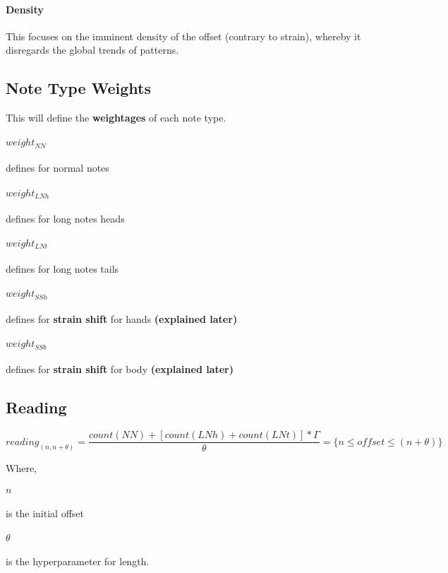 \documentclass{article}
\begin{document}
\paragraph{Density} This focuses on the imminent density of the offset (contrary to strain), whereby it disregards the global trends of patterns.

\subsection{Note Type Weights}

This will define the \textbf{weightages} of each note type.
\paragraph{$weight_{NN}$} defines for normal notes
\paragraph{$weight_{LNh}$} defines for long notes heads
\paragraph{$weight_{LNt}$} defines for long notes tails
\paragraph{$weight_{SSh}$} defines for \textbf{strain shift} for hands \textbf{(explained later)}
\paragraph{$weight_{SSb}$} defines for \textbf{strain shift} for body \textbf{(explained later)}

\subsection{Reading}

$$ reading_{(n,n+\theta)} = 
\frac{ count(NN) + \left[ count(LNh) + count(LNt)\right] * \Gamma }{\theta}
= \lbrace n \leq offset \leq (n+ \theta) \rbrace$$

Where,

\paragraph{$n$} is the initial offset
\paragraph{$\theta$} is the hyperparameter for length.
\end{document}
